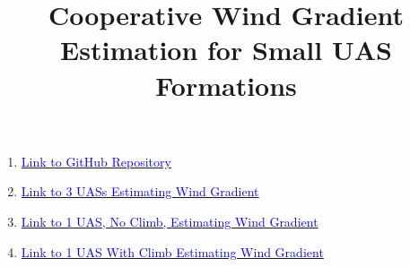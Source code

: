 \documentclass[conference]{IEEEtran}
\begin{document}
\title{Cooperative Wind Gradient Estimation for Small UAS Formations\\
}

\author{
}

\maketitle

\begin{enumerate}
    \item \href{https://github.com/nolans12/sUAS-Final-Project}{{\textcolor{blue}{Link to GitHub Repository}}}
    \item \href{https://youtu.be/I1R92603xzI}{{\textcolor{blue}{Link to 3 UASs Estimating Wind Gradient}}}
    \item \href{https://youtu.be/PB9hqby9TCI}{{\textcolor{blue}{Link to 1 UAS, No Climb, Estimating Wind Gradient}}}
    \item \href{https://youtu.be/ZCwqw6uvsHc}{{\textcolor{blue}{Link to 1 UAS With Climb Estimating Wind Gradient}}}
\end{enumerate}






\end{document}
